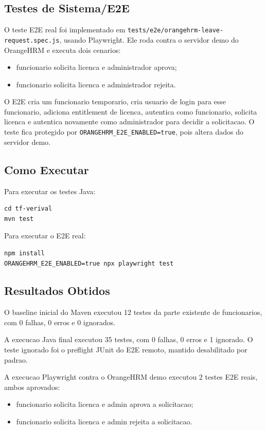 \subsection{Testes de Sistema/E2E}
O teste E2E real foi implementado em \texttt{tests/e2e/orangehrm-leave-request.spec.js}, usando Playwright. Ele roda contra o servidor demo do OrangeHRM e executa dois cenarios:

\begin{itemize}
    \item funcionario solicita licenca e administrador aprova;
    \item funcionario solicita licenca e administrador rejeita.
\end{itemize}

O E2E cria um funcionario temporario, cria usuario de login para esse funcionario, adiciona entitlement de licenca, autentica como funcionario, solicita licenca e autentica novamente como administrador para decidir a solicitacao. O teste fica protegido por \texttt{ORANGEHRM\_E2E\_ENABLED=true}, pois altera dados do servidor demo.

\subsection{Como Executar}
Para executar os testes Java:

\begin{verbatim}
cd tf-verival
mvn test
\end{verbatim}

Para executar o E2E real:

\begin{verbatim}
npm install
ORANGEHRM_E2E_ENABLED=true npx playwright test
\end{verbatim}

\subsection{Resultados Obtidos}
O baseline inicial do Maven executou 12 testes da parte existente de funcionarios, com 0 falhas, 0 erros e 0 ignorados.

A execucao Java final executou 35 testes, com 0 falhas, 0 erros e 1 ignorado. O teste ignorado foi o preflight JUnit do E2E remoto, mantido desabilitado por padrao.

A execucao Playwright contra o OrangeHRM demo executou 2 testes E2E reais, ambos aprovados:

\begin{itemize}
    \item funcionario solicita licenca e admin aprova a solicitacao;
    \item funcionario solicita licenca e admin rejeita a solicitacao.
\end{itemize}

